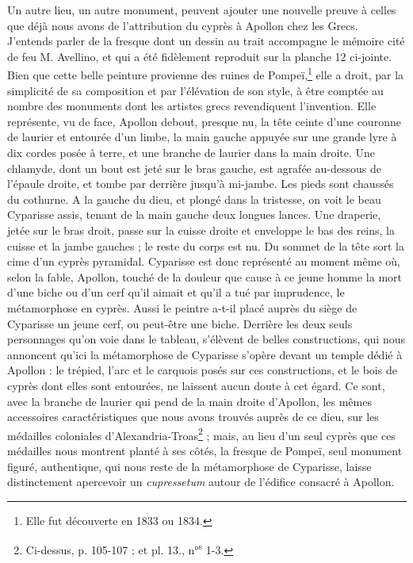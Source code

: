 \documentclass{article}
\begin{document}
Un autre lieu, un autre monument, peuvent ajouter une nouvelle preuve à celles que déjà nous avons de l'attribution du cyprès à Apollon chez les Grecs. J'entends parler de la fresque dont un dessin au trait accompagne le mémoire cité de feu M. Avellino, et qui a été fidèlement reproduit sur la planche 12 ci-jointe. Bien que cette belle peinture provienne des ruines de Pompeï,\footnote{Elle fut découverte en 1833 ou 1834.} elle a droit, par la simplicité de sa composition et par l'élévation de son style, à être comptée au nombre des monuments dont les artistes grecs revendiquent l'invention. Elle représente, vu de face, Apollon debout, presque nu, la tête ceinte d'une couronne de laurier et entourée d'un limbe, la main gauche appuyée sur une grande lyre à dix cordes posée à terre, et une branche de laurier dans la main droite. Une chlamyde, dont un bout est jeté sur le bras gauche, est agrafée au-dessous de l'épaule droite, et tombe par derrière jusqu'à mi-jambe. Les pieds sont chaussés du cothurne. A la gauche du dieu, et plongé dans la tristesse, on voit le beau Cyparisse assis, tenant de la main gauche deux longues lances. Une draperie, jetée sur le bras droit, passe sur la cuisse droite et enveloppe le bas des reins, la cuisse et la jambe gauches ; le reste du corps est nu. Du sommet de la tête sort la cime d'un cyprès pyramidal. Cyparisse est donc représenté au moment même où, selon la fable, Apollon, touché de la douleur que cause à ce jeune homme la mort d'une biche ou d'un cerf qu'il aimait et qu'il a tué par imprudence, le métamorphose en cyprès. Aussi le peintre a-t-il placé auprès du siège de Cyparisse un jeune cerf, ou peut-être une biche. Derrière les deux seuls personnages qu'on voie dans le tableau, s'élèvent de belles constructions, qui nous annoncent qu'ici la métamorphose de Cyparisse s'opère devant un temple dédié à Apollon : le trépied, l'arc et le carquois posés sur ces constructions, et le bois de cyprès dont elles sont entourées, ne laissent aucun doute à cet égard. Ce sont, avec la branche de laurier qui pend de la main droite d'Apollon, les mêmes accessoires caractéristiques que nous avons trouvés auprès de ce dieu, sur les médailles coloniales d'Alexandria-Troas\footnote{Ci-dessus, p. 105-107 ; et pl. 13., n°\textsuperscript{s} 1-3.} ; mais, au lieu d'un seul cyprès que ces médailles nous montrent planté à ses côtés, la fresque de Pompeï, seul monument figuré, authentique, qui nous reste de la métamorphose de Cyparisse, laisse distinctement apercevoir un \emph{cupressetum} autour de l'édifice consacré à Apollon.
\end{document}
